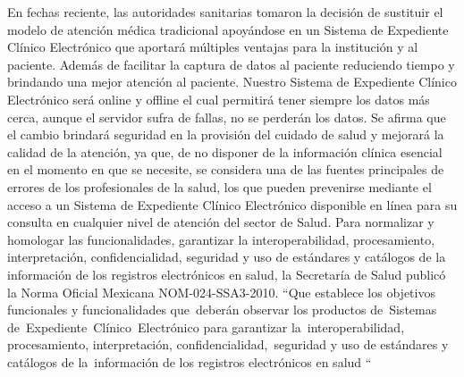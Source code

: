 En fechas reciente, las autoridades sanitarias tomaron la decisión de sustituir el modelo de atención médica tradicional apoyándose en un Sistema de Expediente Clínico Electrónico que aportará múltiples ventajas para la institución y al paciente. Además de facilitar la captura de datos al paciente reduciendo tiempo y brindando una mejor atención al paciente. Nuestro Sistema de Expediente Clínico Electrónico será online y offline el cual permitirá tener siempre los datos más cerca, aunque el servidor sufra de fallas, no se perderán los datos. Se afirma que el cambio brindará seguridad en la provisión del cuidado de salud y mejorará la calidad de la atención, ya que, de no disponer de la información clínica esencial en el momento en que se necesite, se considera una de las fuentes principales de errores de los profesionales de la salud, los que pueden prevenirse mediante el acceso a un Sistema de Expediente Clínico Electrónico disponible en línea para su consulta en cualquier nivel de atención del sector de Salud. Para normalizar y homologar las funcionalidades, garantizar la interoperabilidad, procesamiento, interpretación, confidencialidad, seguridad y uso de estándares y catálogos de la información de los registros electrónicos en salud, la Secretaría de Salud publicó la Norma Oficial Mexicana NOM-024-SSA3-2010.  “Que establece los objetivos funcionales y funcionalidades que deberán observar los productos de Sistemas de Expediente Clínico Electrónico para garantizar la interoperabilidad, procesamiento, interpretación, confidencialidad, seguridad y uso de estándares y catálogos de la información de los registros electrónicos en salud “\cite{SEGOB}
